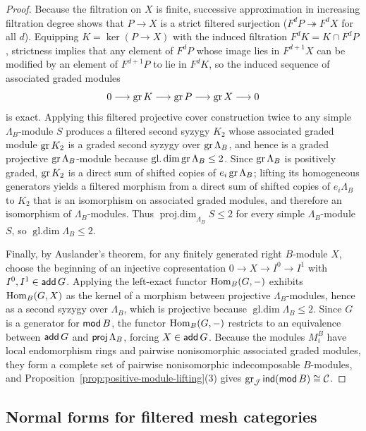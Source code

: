 \begin{proof}
Because the filtration on $X$ is finite, successive approximation in increasing filtration degree shows that $P\to X$ is a strict filtered surjection ($F^dP\twoheadrightarrow F^dX$ for all $d$). Equipping $K=\ker(P\to X)$ with the induced filtration $F^dK=K\cap F^dP$, strictness implies that any element of $F^dP$ whose image lies in $F^{d+1}X$ can be modified by an element of $F^{d+1}P$ to lie in $F^dK$, so the induced sequence of associated graded modules
\[
  0\longrightarrow\operatorname{gr} K\longrightarrow\operatorname{gr} P\longrightarrow\operatorname{gr} X\longrightarrow0
\]
is exact. Applying this filtered projective cover construction twice to any simple $\Lambda_B$-module $S$ produces a filtered second syzygy $K_2$ whose associated graded module $\operatorname{gr} K_2$ is a graded second syzygy over $\operatorname{gr}\Lambda_B$, and hence is a graded projective $\operatorname{gr}\Lambda_B$-module because $\operatorname{gl.dim}\operatorname{gr}\Lambda_B\leq2$. Since $\operatorname{gr}\Lambda_B$ is positively graded, $\operatorname{gr} K_2$ is a direct sum of shifted copies of $e_i\operatorname{gr}\Lambda_B$; lifting its homogeneous generators yields a filtered morphism from a direct sum of shifted copies of $e_i\Lambda_B$ to $K_2$ that is an isomorphism on associated graded modules, and therefore an isomorphism of $\Lambda_B$-modules. Thus $\operatorname{proj.dim}_{\Lambda_B}S\leq2$ for every simple $\Lambda_B$-module $S$, so $\operatorname{gl.dim}\Lambda_B\leq2$.

Finally, by Auslander's theorem, for any finitely generated right $B$-module $X$, choose the beginning of an injective copresentation $0\to X\to I^0\to I^1$ with $I^0,I^1\in\operatorname{\mathsf{add}} G$. Applying the left-exact functor $\operatorname{Hom}_B(G,-)$ exhibits $\operatorname{Hom}_B(G,X)$ as the kernel of a morphism between projective $\Lambda_B$-modules, hence as a second syzygy over $\Lambda_B$, which is projective because $\operatorname{gl.dim}\Lambda_B\leq2$. Since $G$ is a generator for $\operatorname{\mathsf{mod}} B$, the functor $\operatorname{Hom}_B(G,-)$ restricts to an equivalence between $\operatorname{\mathsf{add}} G$ and $\operatorname{\mathsf{proj}}\Lambda_B$, forcing $X\in\operatorname{\mathsf{add}} G$. Because the modules $M_i^B$ have local endomorphism rings and pairwise nonisomorphic associated graded modules, they form a complete set of pairwise nonisomorphic indecomposable $B$-modules, and Proposition~\ref{prop:positive-module-lifting}(3) gives $\operatorname{gr}_\mathcal J\operatorname{\mathsf{ind}}(\operatorname{\mathsf{mod}} B)\cong\mathcal C$.
\end{proof}

\subsection{Normal forms for filtered mesh categories}

